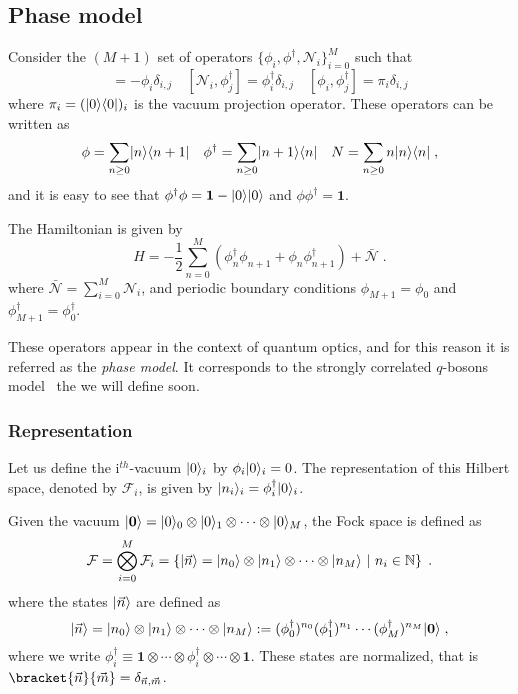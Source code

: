 \documentclass[a4paper,11pt]{amsart}
\begin{document}
\subsection{Phase model}
Consider the \((M+1)\) set of operators \(\{\phi_i,
\phi^\dagger,\mathcal{N}_i\}_{i=0}^M\) such that
\begin{equation}
 [\mathcal{N}_i, \phi_j] = - \phi_i \delta_{i,j} \quad
 [\mathcal{N}_i, \phi_j^\dagger] =  \phi_i^\dagger \delta_{i,j}  \quad 
 [\phi_i, \phi_j^\dagger] =  \pi_i \delta_{i,j}  
\end{equation}
where \(\pi_i =(\lvert0\rangle \langle0\rvert)_i\) is the vacuum projection operator.
These operators can be written as
\begin{equation}
\phi = \sum_{n\geq 0}\lvert n\rangle\langle n+1\rvert\quad 
\phi^\dagger = \sum_{n\geq 0}\lvert n+1\rangle\langle n\rvert \quad 
N = \sum_{n\geq 0}n\lvert n\rangle\langle n\rvert\; ,
\end{equation}
and it is easy to see that \(\phi^\dagger \phi = \bm{1} - \lvert0\rangle
\lvert0\rangle\) and \(\phi\phi^\dagger = \bm{1}\).

The Hamiltonian is given by
\begin{equation}
  H = - \frac{1}{2} \sum_{n =0}^M \left(\phi_n^\dagger \phi_{n+1}
  + \phi_n \phi_{n+1}^\dagger \right) + \bar{\mathcal{N}}\; .
\end{equation}
where \(\bar{\mathcal{N}} = \sum_{i=0}^M \mathcal{N}_i\), and
periodic boundary conditions \(\phi_{M+1} = \phi_0\) and
\(\phi_{M+1}^\dagger = \phi_0^\dagger\).

These operators appear in the context of quantum optics, and for
this reason it is referred as the \emph{phase model}. It 
corresponds to the strongly correlated \(q\)-bosons
model~\cite{Bogoliubov:1997soj} the we will define soon.

\subsubsection{Representation}
Let us define the i\(^{th}\)-vacuum \(\lvert0\rangle_i\) by \(\phi_i\lvert0\rangle_i
= 0\).  The representation of this Hilbert space, denoted by
\(\mathcal{F}_i\), is given by \(\lvert n_i\rangle_i = \phi_i^\dagger
\lvert0\rangle_i\).

Given the vacuum \(\lvert\bm{0}\rangle = \lvert0\rangle_0\otimes \lvert0\rangle_1
\otimes \cdots \otimes  \lvert0\rangle_M\),
the Fock space is defined as 
\begin{equation}
  \mathcal{F} = \bigotimes_{i=0}^M \mathcal{F}_i = 
  \left\{\lvert\vec{n}\rangle = \lvert n_0\rangle\otimes \lvert n_1\rangle \otimes \cdots
  \otimes \lvert n_M\rangle \ | \ n_i \in \mathbb{N} \right\}\; .
\end{equation}
where the states \(\lvert\vec{n}\rangle\) are defined as 
\begin{equation}
  \lvert\vec{n}\rangle = \lvert n_0\rangle\otimes \lvert n_1\rangle \otimes \cdots \otimes \lvert n_M\rangle 
 : =  (\phi_0^\dagger)^{n_0} (\phi_1^\dagger)^{n_1} \cdots  (\phi_M^\dagger)^{n_M} \lvert\bm{0}\rangle \; ,
\end{equation}
where we write \(\phi_i^\dagger \equiv \bm{1} \otimes  \cdots \otimes
\phi_i^\dagger \otimes \cdots \otimes \bm{1}\).
These states are normalized, that is
\(\bracket{\vec{n}}{\vec{m}}=\delta_{\vec{n}, \vec{m}}\). 
\end{document}
